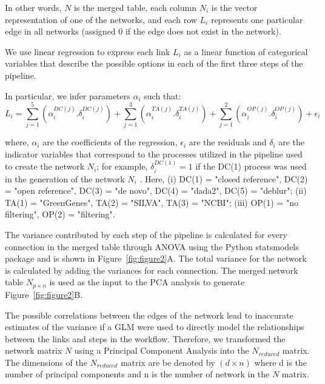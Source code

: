   In other words, $N$ is the merged table, each column $N_i$ is the vector representation of one of the networks, and each row $L_i$ represents one particular edge in all networks (assigned 0 if the edge does not exist in the network).

  We use linear regression to express each link $L_i$ as a linear function of categorical variables that describe the possible options in each of the first three steps of the pipeline.

  In particular, we infer parameters $\alpha_i$ such that:
   \begin{equation*}
       L_i = \sum_{j=1}^5 \left( \alpha^{DC(j)}_i.\delta^{DC(j)}_i \right) +
             \sum_{j=1}^3 \left( \alpha^{TA(j)}_i.\delta^{TA(j)}_i \right) +
             \sum_{j=1}^2 \left( \alpha^{OP(j)}_i.\delta^{OP(j)}_i \right) +
             \epsilon_i
   \end{equation*}

   where, $\alpha_i$ are the coefficients of the regression, $\epsilon_i$ are the residuals and $\delta_i$ are the indicator variables that correspond to the processes utilized in the pipeline used to create the network $N_i$; for example, $\delta^{DC(1)}_i = 1$ if the DC(1) process was used in the generation of the network $N_i$ .
   Here, (i) DC(1) = "closed reference", DC(2) = "open reference", DC(3) = "de novo", DC(4) = "dada2", DC(5) = "deblur"; (ii)  TA(1) = "GreenGenes", TA(2) = "SILVA", TA(3) = "NCBI"; (iii) OP(1) = "no filtering", OP(2) = "filtering".

  The variance contributed by each step of the pipeline is calculated for every connection in the merged table through ANOVA using the Python statsmodels package and is shown in Figure~\ref{fig:figure2}A.
  The total variance for the network is calculated by adding the variances for each connection.
  The merged network table $N_{p \times n}$ is used as the input to the PCA analysis to generate Figure~\ref{fig:figure2}B.

  The possible correlations between the edges of the network lead to inaccurate estimates of the variance if a GLM were used to directly model the relationships between the links and steps in the workflow. Therefore, we transformed the network matrix $N$ using a Principal Component Analysis into the $N_{reduced}$ matrix. The dimensions of the $N_{reduced}$ matrix are be denoted by $(d \times n)$ where d is the number of principal components and n is the number of network in the $N$ matrix.



